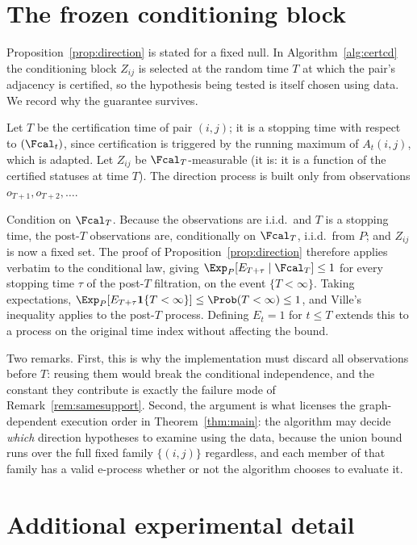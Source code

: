 \begin{appendices}
\section{The frozen conditioning block}\label{app:conditioning}

Proposition~\ref{prop:direction} is stated for a fixed null. In
Algorithm~\ref{alg:certcd} the conditioning block $Z_{ij}$ is selected at the
random time $T$ at which the pair's adjacency is certified, so the hypothesis
being tested is itself chosen using data. We record why the guarantee survives.

Let $T$ be the certification time of pair $(i,j)$; it is a stopping time with
respect to $(\Fcal_t)$, since certification is triggered by the running
maximum of $A_t(i,j)$, which is adapted. Let $Z_{ij}$ be $\Fcal_T$-measurable
(it is: it is a function of the certified statuses at time $T$). The direction
process is built only from observations $o_{T+1}, o_{T+2}, \dots$.

Condition on $\Fcal_T$. Because the observations are i.i.d.\ and $T$ is a
stopping time, the post-$T$ observations are, conditionally on $\Fcal_T$,
i.i.d.\ from $P$; and $Z_{ij}$ is now a fixed set. The proof of
Proposition~\ref{prop:direction} therefore applies verbatim to the
conditional law, giving
$\Exp_P[E_{T+\tau} \mid \Fcal_T] \le 1$ for every stopping time $\tau$ of the
post-$T$ filtration, on the event $\{T < \infty\}$. Taking expectations,
$\Exp_P[E_{T+\tau} \mathbf{1}\{T<\infty\}] \le \Prob(T<\infty) \le 1$, and
Ville's inequality applies to the post-$T$ process. Defining $E_t = 1$ for
$t \le T$ extends this to a process on the original time index without
affecting the bound.

Two remarks. First, this is why the implementation must discard all
observations before $T$: reusing them would break the conditional
independence, and the constant they contribute is exactly the failure mode of
Remark~\ref{rem:samesupport}. Second, the argument is what licenses the
graph-dependent execution order in Theorem~\ref{thm:main}: the algorithm may
decide \emph{which} direction hypotheses to examine using the data, because
the union bound runs over the full fixed family $\{(i,j)\}$ regardless, and
each member of that family has a valid e-process whether or not the algorithm
chooses to evaluate it.

\section{Additional experimental detail}\label{app:extra}


\end{appendices}
